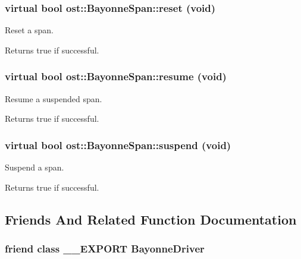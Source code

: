 \subsubsection[{reset}]{\setlength{\rightskip}{0pt plus 5cm}virtual bool ost::BayonneSpan::reset (void)\hspace{0.3cm}{\ttfamily  [virtual]}}\label{classost_1_1_bayonne_span_a605637e215c8e9f173ab1d1c69b93dc6}


Reset a span. \begin{DoxyReturn}{Returns}
true if successful. 
\end{DoxyReturn}
\subsubsection[{resume}]{\setlength{\rightskip}{0pt plus 5cm}virtual bool ost::BayonneSpan::resume (void)\hspace{0.3cm}{\ttfamily  [virtual]}}\label{classost_1_1_bayonne_span_a81b9e93bbd86ad862486d59a172aaa50}


Resume a suspended span. \begin{DoxyReturn}{Returns}
true if successful. 
\end{DoxyReturn}
\subsubsection[{suspend}]{\setlength{\rightskip}{0pt plus 5cm}virtual bool ost::BayonneSpan::suspend (void)\hspace{0.3cm}{\ttfamily  [virtual]}}\label{classost_1_1_bayonne_span_ad843100907a6fbf0b93171c279a0e851}


Suspend a span. \begin{DoxyReturn}{Returns}
true if successful. 
\end{DoxyReturn}


\subsection{Friends And Related Function Documentation}
\subsubsection[{BayonneDriver}]{\setlength{\rightskip}{0pt plus 5cm}friend class \_\-\_\-EXPORT {\bf BayonneDriver}\hspace{0.3cm}{\ttfamily  [friend]}}\label{classost_1_1_bayonne_span_a722dcbcd08103d309ca710e6ccf24fc9}
